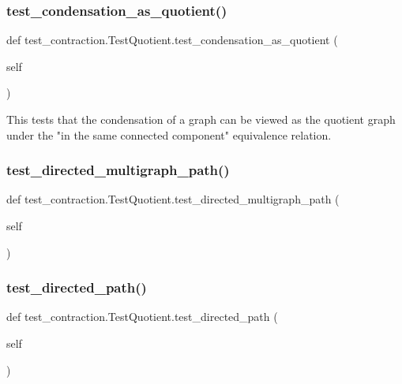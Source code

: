 \subsubsection{\texorpdfstring{test\+\_\+condensation\+\_\+as\+\_\+quotient()}{test\_condensation\_as\_quotient()}}
{\footnotesize\ttfamily def test\+\_\+contraction.\+Test\+Quotient.\+test\+\_\+condensation\+\_\+as\+\_\+quotient (\begin{DoxyParamCaption}\item[{}]{self }\end{DoxyParamCaption})}

\begin{DoxyVerb}This tests that the condensation of a graph can be viewed as the
quotient graph under the "in the same connected component" equivalence
relation.\end{DoxyVerb}
 \mbox{\label{classtest__contraction_1_1TestQuotient_a6f51d082dad002b399b902f8badbebe5}} 
\subsubsection{\texorpdfstring{test\+\_\+directed\+\_\+multigraph\+\_\+path()}{test\_directed\_multigraph\_path()}}
{\footnotesize\ttfamily def test\+\_\+contraction.\+Test\+Quotient.\+test\+\_\+directed\+\_\+multigraph\+\_\+path (\begin{DoxyParamCaption}\item[{}]{self }\end{DoxyParamCaption})}

\mbox{\label{classtest__contraction_1_1TestQuotient_af18d63bd10b8600406f044b4f1a12fbb}} 
\subsubsection{\texorpdfstring{test\+\_\+directed\+\_\+path()}{test\_directed\_path()}}
{\footnotesize\ttfamily def test\+\_\+contraction.\+Test\+Quotient.\+test\+\_\+directed\+\_\+path (\begin{DoxyParamCaption}\item[{}]{self }\end{DoxyParamCaption})}

